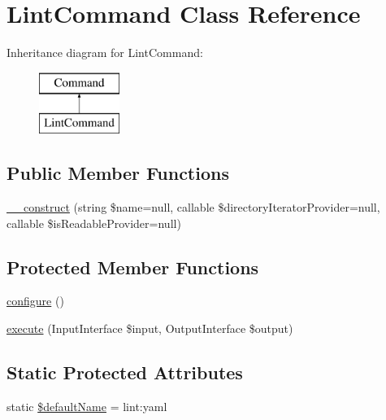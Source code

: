 \hypertarget{class_symfony_1_1_component_1_1_yaml_1_1_command_1_1_lint_command}{}\section{Lint\+Command Class Reference}
\label{class_symfony_1_1_component_1_1_yaml_1_1_command_1_1_lint_command}
Inheritance diagram for Lint\+Command\+:\begin{figure}[H]
\begin{center}
\leavevmode
\includegraphics[height=2.000000cm]{class_symfony_1_1_component_1_1_yaml_1_1_command_1_1_lint_command}
\end{center}
\end{figure}
\subsection*{Public Member Functions}
\begin{DoxyCompactItemize}
\item 
\mbox{\hyperlink{class_symfony_1_1_component_1_1_yaml_1_1_command_1_1_lint_command_a167134f30ff3446d19da8c08695d07c7}{\+\_\+\+\_\+construct}} (string \$name=null, callable \$directory\+Iterator\+Provider=null, callable \$is\+Readable\+Provider=null)
\end{DoxyCompactItemize}
\subsection*{Protected Member Functions}
\begin{DoxyCompactItemize}
\item 
\mbox{\hyperlink{class_symfony_1_1_component_1_1_yaml_1_1_command_1_1_lint_command_a9be5e0bdb5720efed6ddb6426c5c16ee}{configure}} ()
\item 
\mbox{\hyperlink{class_symfony_1_1_component_1_1_yaml_1_1_command_1_1_lint_command_ab31c72b72ddaf7116db5d84c055d3c0b}{execute}} (Input\+Interface \$input, Output\+Interface \$output)
\end{DoxyCompactItemize}
\subsection*{Static Protected Attributes}
\begin{DoxyCompactItemize}
\item 
static \mbox{\hyperlink{class_symfony_1_1_component_1_1_yaml_1_1_command_1_1_lint_command_a8f95e09946a819ad70ca9e71e8c0d153}{\$default\+Name}} = \textquotesingle{}lint\+:yaml\textquotesingle{}
\end{DoxyCompactItemize}



